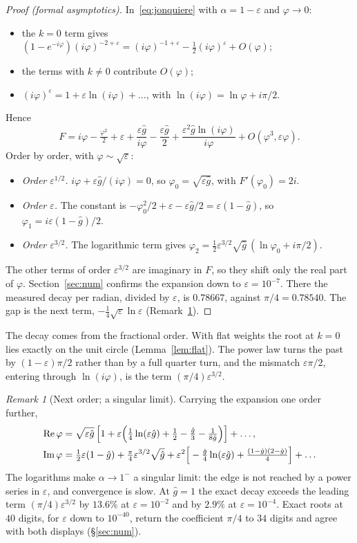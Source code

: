 \documentclass[11pt]{amsart}
\theoremstyle{definition}
\theoremstyle{remark}
\newtheorem{remark}[theorem]{Remark}
\newcommand{\eps}{\varepsilon}
\begin{document}
\begin{proof}[Proof (formal asymptotics)]
In~\eqref{eq:jonquiere} with $\alpha=1-\eps$ and $\varphi\to0$:
\begin{itemize}
\item the $k=0$ term gives $(1-e^{-i\varphi})(i\varphi)^{-2+\eps}=(i\varphi)^{-1+\eps}-\tfrac12(i\varphi)^\eps+O(\varphi)$;
\item the terms with $k\ne0$ contribute $O(\varphi)$;
\item $(i\varphi)^{\eps}=1+\eps\ln(i\varphi)+\dots$, with $\ln(i\varphi)=\ln\varphi+i\pi/2$.
\end{itemize}
Hence
\[
F=i\varphi-\tfrac{\varphi^2}2+\eps+\frac{\eps\hat g}{i\varphi}-\frac{\eps\hat g}2+\frac{\eps^2\hat g\ln(i\varphi)}{i\varphi}+O(\varphi^3,\eps\varphi).
\]
Order by order, with $\varphi\sim\sqrt\eps$:
\begin{itemize}
\item \emph{Order $\eps^{1/2}$.} $i\varphi+\eps\hat g/(i\varphi)=0$, so $\varphi_0=\sqrt{\eps\hat g}$, with $F'(\varphi_0)=2i$.
\item \emph{Order $\eps$.} The constant is $-\varphi_0^2/2+\eps-\eps\hat g/2=\eps(1-\hat g)$, so $\varphi_1=i\eps(1-\hat g)/2$.
\item \emph{Order $\eps^{3/2}$.} The logarithmic term gives $\varphi_2=\tfrac12\eps^{3/2}\sqrt{\hat g}\,(\ln\varphi_0+i\pi/2)$.
\end{itemize}
The other terms of order $\eps^{3/2}$ are imaginary in $F$, so they shift only the real part of $\varphi$. Section~\ref{sec:num} confirms the expansion down to $\eps=10^{-7}$. There the measured decay per radian, divided by $\eps$, is $0.78667$, against $\pi/4=0.78540$. The gap is the next term, $-\tfrac14\sqrt\eps\ln\eps$ (Remark~\ref{rem:nextorder}).
\end{proof}

The decay comes from the fractional order. With flat weights the root at $k=0$ lies exactly on the unit circle (Lemma~\ref{lem:flat}). The power law turns the past by $(1-\eps)\pi/2$ rather than by a full quarter turn, and the mismatch $\eps\pi/2$, entering through $\ln(i\varphi)$, is the term $(\pi/4)\eps^{3/2}$.

\begin{remark}[Next order; a singular limit]\label{rem:nextorder}
Carrying the expansion one order further,
\begin{align*}
{\rm Re}\,\varphi&=\sqrt{\eps\hat g}\,\Big[1+\eps\Big(\tfrac14\ln(\eps\hat g)+\tfrac12-\tfrac{\hat g}3-\tfrac1{8\hat g}\Big)\Big]+\dots,\\
{\rm Im}\,\varphi&=\tfrac12\eps(1-\hat g)+\tfrac\pi4\eps^{3/2}\sqrt{\hat g}+\eps^2\Big[-\tfrac{\hat g}4\ln(\eps\hat g)+\tfrac{(1-\hat g)(2-\hat g)}4\Big]+\dots
\end{align*}
The logarithms make $\alpha\to1^-$ a singular limit: the edge is not reached by a power series in $\eps$, and convergence is slow. At $\hat g=1$ the exact decay exceeds the leading term $(\pi/4)\eps^{3/2}$ by $13.6\%$ at $\eps=10^{-2}$ and by $2.9\%$ at $\eps=10^{-4}$. Exact roots at $40$ digits, for $\eps$ down to $10^{-40}$, return the coefficient $\pi/4$ to $34$ digits and agree with both displays (\S\ref{sec:num}).
\end{remark}
\end{document}
